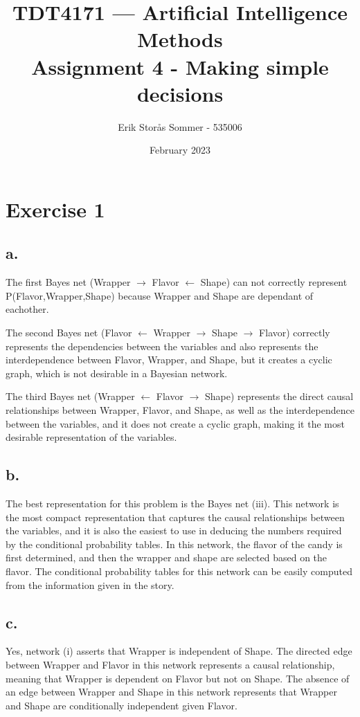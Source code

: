 \documentclass{article}
\title{TDT4171 — Artificial Intelligence Methods \\ Assignment 4 - Making simple decisions}
\author{Erik Storås Sommer - 535006}
\date{February 2023}
\begin{document}
\maketitle

\section*{Exercise 1}

\subsection*{a.}

The first Bayes net (Wrapper $\rightarrow$ Flavor $\leftarrow$ Shape) can not correctly represent P(Flavor,Wrapper,Shape) because Wrapper and Shape are dependant of eachother.

The second Bayes net (Flavor $\leftarrow$ Wrapper $\rightarrow$ Shape $\rightarrow$ Flavor) correctly represents the dependencies between the variables and also represents the interdependence between Flavor, Wrapper, and Shape, but it creates a cyclic graph, which is not desirable in a Bayesian network.

The third Bayes net (Wrapper $\leftarrow$ Flavor $\rightarrow$ Shape) represents the direct causal relationships between Wrapper, Flavor, and Shape, as well as the interdependence between the variables, and it does not create a cyclic graph, making it the most desirable representation of the variables.

\subsection*{b.}

The best representation for this problem is the Bayes net (iii). This network is the most compact representation that captures the causal relationships between the variables, and it is also the easiest to use in deducing the numbers required by the conditional probability tables. In this network, the flavor of the candy is first determined, and then the wrapper and shape are selected based on the flavor. The conditional probability tables for this network can be easily computed from the information given in the story.


\subsection*{c.}

Yes, network (i) asserts that Wrapper is independent of Shape. The directed edge between Wrapper and Flavor in this network represents a causal relationship, meaning that Wrapper is dependent on Flavor but not on Shape. The absence of an edge between Wrapper and Shape in this network represents that Wrapper and Shape are conditionally independent given Flavor.
\end{document}
